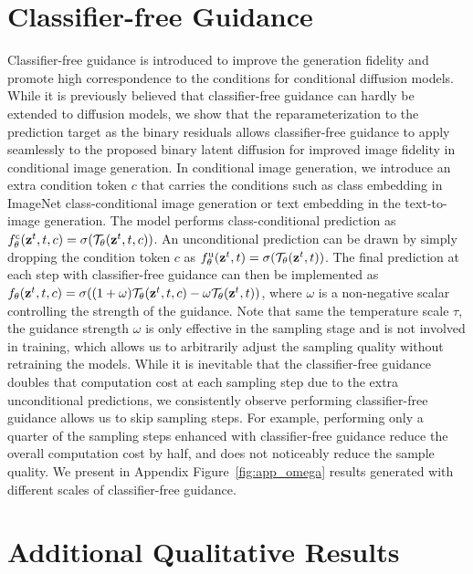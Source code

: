 \documentclass[10pt,twocolumn,letterpaper]{article}
\begin{document}
\section{Classifier-free Guidance}
\label{cfg}
Classifier-free guidance \cite{ho2022classifier} is introduced to improve the generation fidelity and promote high correspondence to the conditions for conditional diffusion models. 
While it is previously believed that classifier-free guidance can hardly be extended to diffusion models, we show that the reparameterization to the prediction target as the binary residuals allows classifier-free guidance to apply seamlessly to the proposed binary latent diffusion for improved image fidelity in conditional image generation. 
In conditional image generation, we introduce an extra condition token $c$ that carries the conditions such as class embedding in ImageNet class-conditional image generation or text embedding in the text-to-image generation. The model performs class-conditional prediction as $f_\theta^\text{c}(\textbf{z}^t, t, c) = \sigma(\mathcal{T}_\theta(\textbf{z}^t, t, c))$. 
An unconditional prediction can be drawn by simply dropping the condition token $c$ as $f_\theta^\text{u}(\textbf{z}^t, t) = \sigma(\mathcal{T}_\theta(\textbf{z}^t, t))$. The final prediction at each step with classifier-free guidance can then be implemented as  $f_\theta(\textbf{z}^t, t, c) =  \sigma((1 + \omega) \mathcal{T}_\theta(\textbf{z}^t, t, c) - \omega \mathcal{T}_\theta(\textbf{z}^t, t) )$, where $\omega$ is a non-negative scalar controlling the strength of the guidance. Note that same the temperature scale $\tau$, the guidance strength $\omega$ is only effective in the sampling stage and is not involved in training, which allows us to arbitrarily adjust the sampling quality without retraining the models. While it is inevitable that the classifier-free guidance doubles that computation cost at each sampling step due to the extra unconditional predictions, we consistently observe performing classifier-free guidance allows us to skip sampling steps. For example, performing only a quarter of the sampling steps enhanced with classifier-free guidance reduce the overall computation cost by half, and does not noticeably reduce the sample quality. We present in Appendix Figure~\ref{fig:app_omega} results generated with different scales of classifier-free guidance. 


\section{Additional Qualitative Results}
\end{document}

